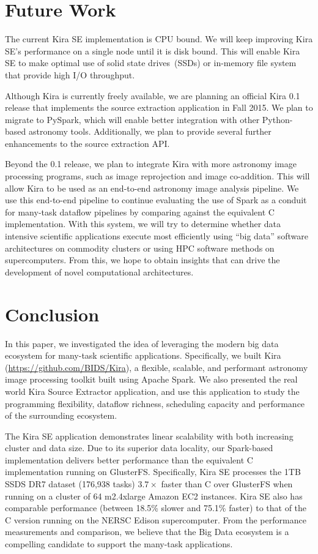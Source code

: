 \documentclass[10pt, conference, compsocconf]{IEEEtran}
\begin{document}
\section{Future Work}
\label{sec:Future}

The current Kira SE implementation is CPU bound. We will keep improving Kira SE's performance
on a single node until it is disk bound. This will enable Kira SE to make optimal use of
solid state drives~(SSDs) or in-memory file system that provide high I/O throughput.

Although Kira is currently freely available, we are planning an official Kira 0.1 release
that implements the source extraction application in Fall 2015.
We plan to migrate to PySpark, which will enable better integration with other
Python-based astronomy tools. Additionally, we plan to provide several further enhancements to
the source extraction API.

Beyond the 0.1 release, we plan to integrate Kira with more astronomy image processing
programs, such as image reprojection and image co-addition. This will allow Kira to be
used as an end-to-end astronomy image analysis pipeline. We use this end-to-end pipeline
to continue evaluating the use of Spark as a conduit for many-task dataflow pipelines by
comparing against the equivalent C implementation. With this system, we will try to determine
whether data intensive scientific applications execute most efficiently using ``big data''
software architectures on commodity clusters or using HPC software methods on supercomputers.
From this, we hope to obtain insights that can drive the development of novel computational
architectures.

\section{Conclusion}
\label{sec:Conclusion}

In this paper, we investigated the idea of leveraging the modern big data ecosystem for many-task
scientific applications. Specifically, we built Kira (\url{https://github.com/BIDS/Kira}), a flexible, scalable,
and performant astronomy image processing toolkit built using Apache Spark. We also presented
the real world Kira Source Extractor application, and use this application to study the programming
flexibility, dataflow richness, scheduling capacity and performance of the surrounding ecosystem.

The Kira SE application demonstrates linear scalability with both increasing cluster and data
size. Due to its superior data locality, our Spark-based implementation delivers better performance than the equivalent C 
implementation running on GlusterFS. Specifically, Kira SE processes the 1TB SSDS DR7 dataset (176,938 tasks)
$3.7\times$ faster than C over GlusterFS when running on a cluster of 64 m2.4xlarge Amazon
EC2 instances. Kira SE also has comparable performance (between 18.5\% slower and 75.1\% faster)
to that of the C version running on the NERSC Edison supercomputer. From the performance
measurements and comparison, we believe that the Big Data ecosystem is a compelling candidate
to support the many-task applications. 
\end{document}
